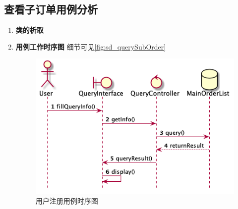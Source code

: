 	\subsection{查看子订单用例分析} %
	\label{sub:查看子订单用例分析}
	\begin{enumerate}
		\item \textbf{类的析取}

		\item \textbf{用例工作时序图}
		细节可见\autoref{fig:sd_querySubOrder}

		\begin{figure}[htp]
		    \centering
		    \includegraphics[width=12cm]{figure/sequenceDiagram/sd_query.png}
		    \caption{用户注册用例时序图}
		    \label{fig:sd_querySubOrder}
		\end{figure}
	\end{enumerate}
	

